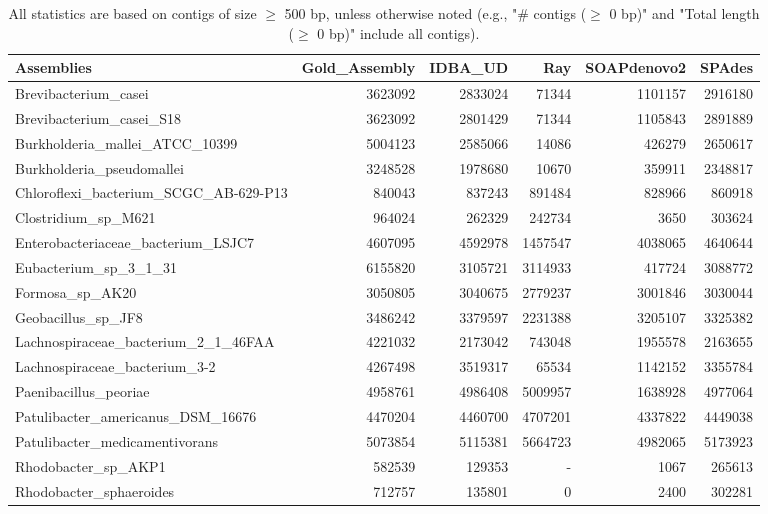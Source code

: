 \documentclass[12pt,a4paper]{article}
\begin{document}
\begin{table}[ht]
\begin{center}
\caption{All statistics are based on contigs of size $\geq$ 500 bp, unless otherwise noted (e.g., "\# contigs ($\geq$ 0 bp)" and "Total length ($\geq$ 0 bp)" include all contigs).}
\begin{tabular}{|l*{5}{|r}|}
\hline
Assemblies & Gold\_Assembly & IDBA\_UD & Ray & SOAPdenovo2 & SPAdes \\ \hline
Brevibacterium\_casei & 3623092 & 2833024 & 71344 & 1101157 & 2916180 \\ \hline
Brevibacterium\_casei\_S18 & 3623092 & 2801429 & 71344 & 1105843 & 2891889 \\ \hline
Burkholderia\_mallei\_ATCC\_10399 & 5004123 & 2585066 & 14086 & 426279 & 2650617 \\ \hline
Burkholderia\_pseudomallei & 3248528 & 1978680 & 10670 & 359911 & 2348817 \\ \hline
Chloroflexi\_bacterium\_SCGC\_AB-629-P13 & 840043 & 837243 & 891484 & 828966 & 860918 \\ \hline
Clostridium\_sp\_M621 & 964024 & 262329 & 242734 & 3650 & 303624 \\ \hline
Enterobacteriaceae\_bacterium\_LSJC7 & 4607095 & 4592978 & 1457547 & 4038065 & 4640644 \\ \hline
Eubacterium\_sp\_3\_1\_31 & 6155820 & 3105721 & 3114933 & 417724 & 3088772 \\ \hline
Formosa\_sp\_AK20 & 3050805 & 3040675 & 2779237 & 3001846 & 3030044 \\ \hline
Geobacillus\_sp\_JF8 & 3486242 & 3379597 & 2231388 & 3205107 & 3325382 \\ \hline
Lachnospiraceae\_bacterium\_2\_1\_46FAA & 4221032 & 2173042 & 743048 & 1955578 & 2163655 \\ \hline
Lachnospiraceae\_bacterium\_3-2 & 4267498 & 3519317 & 65534 & 1142152 & 3355784 \\ \hline
Paenibacillus\_peoriae & 4958761 & 4986408 & 5009957 & 1638928 & 4977064 \\ \hline
Patulibacter\_americanus\_DSM\_16676 & 4470204 & 4460700 & 4707201 & 4337822 & 4449038 \\ \hline
Patulibacter\_medicamentivorans & 5073854 & 5115381 & 5664723 & 4982065 & 5173923 \\ \hline
Rhodobacter\_sp\_AKP1 & 582539 & 129353 & - & 1067 & 265613 \\ \hline
Rhodobacter\_sphaeroides & 712757 & 135801 & 0 & 2400 & 302281 \\ \hline

\end{tabular}
\end{center}
\end{table}
\end{document}
